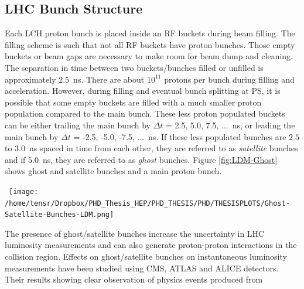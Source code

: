 \subsection{LHC Bunch Structure}
Each LCH proton bunch is placed inside an RF buckets during beam filling. %
The filling scheme is such that not all RF buckets have proton bunches. 
Those empty buckets or beam gaps are necessary to make room for beam dump and cleaning.%
The separation in time between two buckets/bunches filled or unfilled is approximately $2.5$~ns. There are  about $10^{11}$ protons per bunch during filling and acceleration.
However, during filling and eventual bunch splitting at PS, it is possible that some empty buckets are filled with a much smaller proton population compared to the main bunch. These less proton populated buckets can be either trailing the main bunch by $\Delta t$ = 2.5, 5.0, 7.5, $\ldots$~ns, or leading the main bunch by $\Delta t$ = -2.5, -5.0, -7.5, $\ldots$~ns. If these less populated bunches are $2.5$ to $3.0$~ns spaced in time from each other, they are referred to as \textit{satellite} bunches and if $5.0$~ns, they are referred to as \textit{ghost} bunches. Figure \ref{fig:LDM-Ghost} shows ghost and satellite bunches and a main proton bunch.
\begin{center}
\centering
\mbox{
\texttt{[image: /home/tensr/Dropbox/PHD\_Thesis\_HEP/PHD\_THESIS/PHD/THESISPLOTS/Ghost-Satellite-Bunches-LDM.png]}} 
\label{fig:LDM-Ghost}
\end{center}
The presence of ghost/satellite bunches increase the uncertainty in LHC luminosity measurements and can also generate proton-proton interactions in the collision region. Effects on ghost/satellite bunches on instantaneous luminosity measurements have been studied 
using CMS, ATLAS and ALICE detectors.  Their results showing clear observation of physics events produced from
